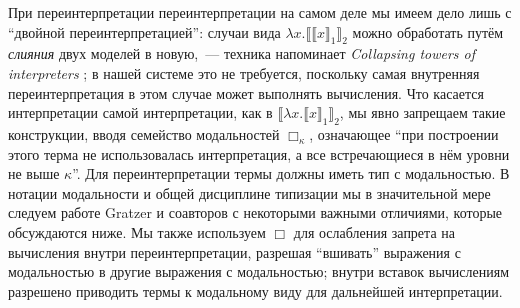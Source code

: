 При переинтерпретации переинтерпретации на самом деле
мы имеем дело лишь с ``двойной переинтерпретацией'':
случаи вида $\lambda x.\llbracket\llbracket x
\rrbracket_1 \rrbracket_2$ можно обработать путём
\textit{слияния} двух моделей в новую,~--- техника
напоминает \textit{Collapsing towers of interpreters}
\cite{Amin2017}; в нашей системе это не требуется,
поскольку самая внутренняя переинтерпретация в этом
случае может выполнять вычисления. Что касается
интерпретации самой интерпретации, как в
$\llbracket\lambda x.\llbracket x \rrbracket_1
\rrbracket_2$, мы явно запрещаем такие конструкции,
вводя семейство модальностей $\Box_\kappa$, означающее
``при построении этого терма не использовалась
интерпретация, а все встречающиеся в нём уровни не выше
$\kappa$''. Для переинтерпретации термы должны иметь
тип с модальностью. В нотации модальности и общей
дисциплине типизации мы в значительной мере следуем
работе Gratzer и соавторов \cite{Gratzer2019} с
некоторыми важными отличиями, которые обсуждаются ниже.
Мы также используем $\Box$ для ослабления запрета на
вычисления внутри переинтерпретации, разрешая
``вшивать'' выражения с модальностью в другие выражения
с модальностью; внутри вставок вычислениям разрешено
приводить термы к модальному виду для дальнейшей
интерпретации.


